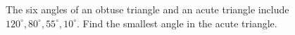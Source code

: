 The six angles of an obtuse triangle and an acute triangle include $120^\circ,80^\circ,55^\circ,10^\circ$. Find the smallest angle in the acute triangle.
